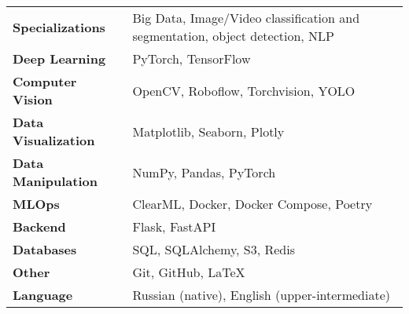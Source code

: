 
\begin{tabular}{@{}l p{0.75\textwidth\qquad}@{}}
\textbf{Specializations} & Big Data, Image/Video classification and segmentation, object detection, NLP \\
\textbf{Deep Learning}   & PyTorch, TensorFlow \\
\textbf{Computer Vision}& OpenCV, Roboflow, Torchvision, YOLO \\
\textbf{Data Visualization}& Matplotlib, Seaborn, Plotly \\
\textbf{Data Manipulation}& NumPy, Pandas, PyTorch \\
\textbf{MLOps}           & ClearML, Docker, Docker Compose, Poetry \\
\textbf{Backend}         & Flask, FastAPI \\
\textbf{Databases}       & SQL, SQLAlchemy, S3, Redis \\
\textbf{Other}           & Git, GitHub, \LaTeX \\
\textbf{Language}&Russian (native), English (upper-intermediate)
\end{tabular}
